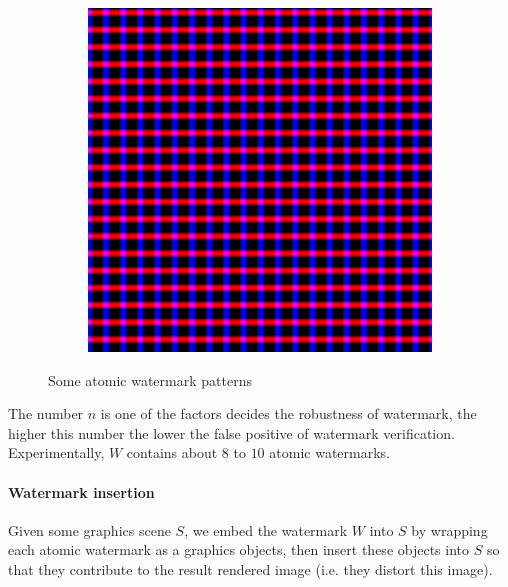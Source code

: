 \begin{figure}[h]
\begin{subfigure}[b]{0.25\textwidth}
        \includegraphics[width=\textwidth]{w_inferix_1.png}
    \end{subfigure}
    \caption[Some atomic watermark patterns]{Some atomic watermark patterns}
    \label{fig:atomic_patterns}
\end{figure}
The number $n$ is one of the factors decides the robustness of watermark, the higher this number the lower the false positive of watermark verification. Experimentally, $W$ contains about $8$ to $10$ atomic watermarks.

\paragraph[Watermark insertion]{Watermark insertion}
Given some graphics scene $S$, we embed the watermark $W$ into $S$ by wrapping each atomic watermark as a graphics objects, then insert these objects into $S$ so that they contribute to the result rendered image (i.e. they distort this image).

